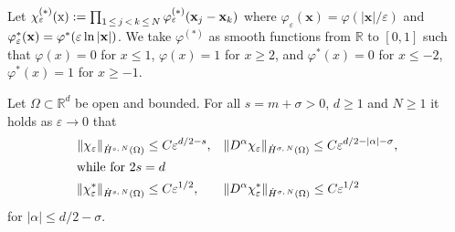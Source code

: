 \documentclass[AHL, Unicode, longabstracts, published]{cedram}
\newcommand*\eps{\varepsilon}
\newcommand*\R {\mathbb{R}}
\newcommand\1{{\ensuremath {\mathds 1} }}
\newcommand{\bx}{\mathbf{x}}
\newcommand{\sx}{\textup{x}}
\begin{document}
Let $\chi_\eps^{(*)}(\sx) := \prod_{1\,\le\,j\,<\,k\,\le\,N} \varphi_\eps^{(*)}(\bx_j-\bx_k)$ where $\varphi_\eps(\bx) = \varphi(|\bx|/\eps)$ and $\varphi_\eps^*(\bx) \linebreak= \varphi^*(\eps\ln|\bx|)$. We take $\varphi^{(*)}$ as smooth functions from $\R$ to $[0,1]$ such that $\varphi(x) = 0$ for $x \le 1$, $\varphi(x) = 1$ for $x \ge 2$, and $\varphi^*(x) = 0$ for $x \le -2$, $\varphi^*(x) = 1$ for $x \ge -1$.

\begin{lemm}\label{lem:norm_of_cutoff}
Let $\Omega \subset \R^d$ be open and bounded. For all $s=m +\sigma > 0$, $d \ge 1$ and $N \ge 1$ it holds as $\eps \to 0$ that
\begin{align*}
\| \chi_\eps \|_{\dot{H}^{s,\,N}(\Omega)} &\le C \eps^{d/2-s},
& &\| D^\alpha \chi_\eps \|_{\dot{H}^{\sigma,\,N}(\Omega)} \le C \eps^{d/2-|\alpha|-\sigma},
\\
\intertext{while for $2s=d$}
\| \chi_\eps^* \|_{\dot{H}^{s,\,N}(\Omega)} &\le C \eps^{1/2},
& &\| D^\alpha \chi_\eps^* \|_{\dot{H}^{\sigma,\,N}(\Omega)} \le C \eps^{1/2}
\end{align*}
for $|\alpha| \le d/2-\sigma$.
\end{lemm}
\end{document}
